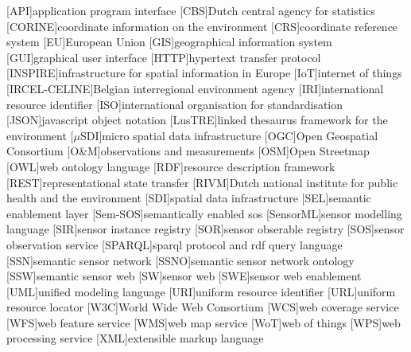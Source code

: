 
\begin{acronym}[UML]
  [API]{application program interface}
  [CBS]{Dutch central agency for statistics}
  [CORINE]{coordinate information on the environment}
  [CRS]{coordinate reference system} 
  [EU]{European Union}
  [GIS]{geographical information system}
  [GUI]{graphical user interface}
  [HTTP]{hypertext transfer protocol}
  [INSPIRE]{infrastructure for spatial information in Europe}
  [IoT]{internet of things}
  [IRCEL-CELINE]{Belgian interregional environment agency}
  [IRI]{international resource identifier}
  [ISO]{international organisation for standardisation}
  [JSON]{javascript object notation}
  [LusTRE]{linked thesaurus framework for the environment} 
  [$\mu$SDI]{micro spatial data infrastructure}
  [OGC]{Open Geospatial Consortium}
  [O\&M]{observations and measurements}
  [OSM]{Open Streetmap}
  [OWL]{web ontology language}
  [RDF]{resource description framework}
  [REST]{representational state transfer}
  [RIVM]{Dutch national institute for public health and the environment}
  [SDI]{spatial data infrastructure}
  [SEL]{semantic enablement layer}
  [Sem-SOS]{semantically enabled sos}
  [SensorML]{sensor modelling language}
  [SIR]{sensor instance registry}
  [SOR]{sensor obserable registry}
  [SOS]{sensor observation service}
  [SPARQL]{sparql protocol and rdf query language}
  [SSN]{semantic sensor network}
  [SSNO]{semantic sensor network ontology}
  [SSW]{semantic sensor web}
  [SW]{sensor web}
  [SWE]{sensor web enablement}
  [UML]{unified modeling language}
  [URI]{uniform resource identifier}
  [URL]{uniform resource locator}
  [W3C]{World Wide Web Consortium}
  [WCS]{web coverage service}
  [WFS]{web feature service}
  [WMS]{web map service}
  [WoT]{web of things}
  [WPS]{web processing service}
  [XML]{extensible markup language}
\end{acronym}